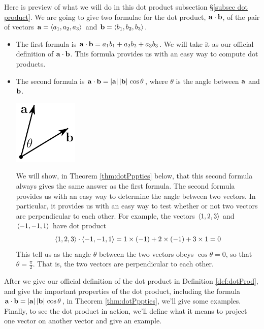 Here is preview of what we will do in this dot product 
subsection \S\ref{subsec dot product}. We are going to give two formulae
for the dot product, $\mathbf{a}\cdot\mathbf{b}$, of the pair of vectors 
$\mathbf{a}=\left< a_1,a_2,a_3\right>$ and $\mathbf{b}=\left< b_1,b_2,b_3\right>$.
\begin{itemize}
\item 
The first formula is $\mathbf{a}\cdot\mathbf{b} = a_1b_1+a_2b_2+a_3b_3$.
We will take it as our official definition of $\mathbf{a}\cdot\mathbf{b}$.
This formula provides us with an easy way to compute dot products.

\item
The second formula is $\mathbf{a}\cdot\mathbf{b}=|\mathbf{a}|\,|\mathbf{b}|\,\cos\theta$, 
        where $\theta$ is the angle between $\mathbf{a}$ and $\mathbf{b}$.
      \begin{efig} 
      \begin{center}
      \includegraphics{dotAngle.pdf}
      \end{center}
      \end{efig}
We will show, in Theorem \ref{thm:dotPppties} below, that this second formula always gives the same answer as the first formula.
The second formula provides us with an easy way to determine the angle between two vectors. In particular, it provides us with an easy way to test whether or not two vectors are perpendicular to each other. For example,
the vectors $\left< 1,2,3\right>$ and $\left< -1,-1,1\right>$ have dot product
\begin{equation*}
\left< 1,2,3\right>\cdot\left< -1,-1,1\right> = 1\times(-1)+2\times(-1)+3\times 1=0
\end{equation*}
This tell us as the angle $\theta$ between the two vectors obeys 
$\cos\theta=0$, so that $\theta=\frac{\pi}{2}$. That is, the two vectors are perpendicular to each other.
\end{itemize}
After we give our official definition of the dot product in
Definition \ref{def:dotProd}, and give the important properties of the dot product, including the formula  $\mathbf{a}\cdot\mathbf{b}=|\mathbf{a}|\,|\mathbf{b}|\,\cos\theta$,
in Theorem \ref{thm:dotPppties}, we'll give some examples.
Finally, to see the dot product in action, we'll define what it means to 
project one vector on another vector and give an example.

